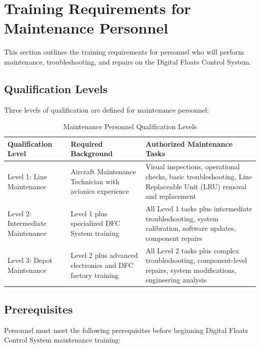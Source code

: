 \documentclass[12pt,a4paper,twoside,openright]{book}
\newcommand{\tabletextfont}{\normalfont\rmfamily}
\newcommand{\tableheadfont}{\normalfont\bfseries}
\begin{document}
\section{Training Requirements for Maintenance Personnel}

This section outlines the training requirements for personnel who will perform maintenance, troubleshooting, and repairs on the Digital Floats Control System.

\subsection{Qualification Levels}

Three levels of qualification are defined for maintenance personnel:

\begin{table}[h]
\centering
\setlength{\tabcolsep}{5pt} %
\begin{tabular}{|p{}|p{}|p{}|}
\hline
\tableheadfont\textbf{Qualification Level} & \tableheadfont\textbf{Required Background} & \tableheadfont\textbf{Authorized Maintenance Tasks} \\
\hline
\tabletextfont Level 1: Line Maintenance & Aircraft Maintenance Technician with avionics experience & Visual inspections, operational checks, basic troubleshooting, Line Replaceable Unit (LRU) removal and replacement \\
\hline
\tabletextfont Level 2: Intermediate Maintenance & Level 1 plus specialized DFC System training & All Level 1 tasks plus intermediate troubleshooting, system calibration, software updates, component repairs \\
\hline
\tabletextfont Level 3: Depot Maintenance & Level 2 plus advanced electronics and DFC factory training & All Level 2 tasks plus complex troubleshooting, component-level repairs, system modifications, engineering analysis \\
\hline
\end{tabular}
\caption{Maintenance Personnel Qualification Levels}
\end{table}

\subsection{Prerequisites}

Personnel must meet the following prerequisites before beginning Digital Floats Control System maintenance training:
\end{document}
